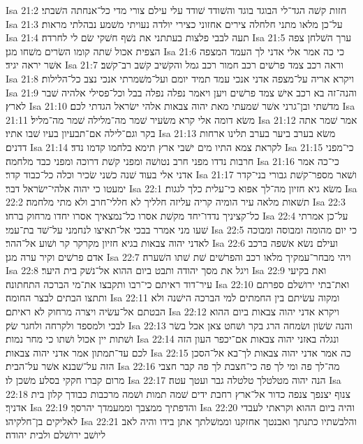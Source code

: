 Isa 21:2  חזות קשׁה הגד־לי הבוגד בוגד והשׁודד שׁודד עלי עילם צורי מדי כל־אנחתה השׁבתי׃
Isa 21:3  על־כן מלאו מתני חלחלה צירים אחזוני כצירי יולדה נעויתי משׁמע נבהלתי מראות׃
Isa 21:4  תעה לבבי פלצות בעתתני את נשׁף חשׁקי שׂם לי לחרדה׃
Isa 21:5  ערך השׁלחן צפה הצפית אכול שׁתה קומו השׂרים משׁחו מגן׃
Isa 21:6  כי כה אמר אלי אדני לך העמד המצפה אשׁר יראה יגיד׃
Isa 21:7  וראה רכב צמד פרשׁים רכב חמור רכב גמל והקשׁיב קשׁב רב־קשׁב׃
Isa 21:8  ויקרא אריה על־מצפה אדני אנכי עמד תמיד יומם ועל־משׁמרתי אנכי נצב כל־הלילות׃
Isa 21:9  והנה־זה בא רכב אישׁ צמד פרשׁים ויען ויאמר נפלה נפלה בבל וכל־פסילי אלהיה שׁבר לארץ׃
Isa 21:10  מדשׁתי ובן־גרני אשׁר שׁמעתי מאת יהוה צבאות אלהי ישׂראל הגדתי לכם׃
Isa 21:11  משׂא דומה אלי קרא משׂעיר שׁמר מה־מלילה שׁמר מה־מליל׃
Isa 21:12  אמר שׁמר אתה בקר וגם־לילה אם־תבעיון בעיו שׁבו אתיו׃
Isa 21:13  משׂא בערב ביער בערב תלינו ארחות דדנים׃
Isa 21:14  לקראת צמא התיו מים ישׁבי ארץ תימא בלחמו קדמו נדד׃
Isa 21:15  כי־מפני חרבות נדדו מפני חרב נטושׁה ומפני קשׁת דרוכה ומפני כבד מלחמה׃
Isa 21:16  כי־כה אמר אדני אלי בעוד שׁנה כשׁני שׂכיר וכלה כל־כבוד קדר׃
Isa 21:17  ושׁאר מספר־קשׁת גבורי בני־קדר ימעטו כי יהוה אלהי־ישׂראל דבר׃
Isa 22:1  משׂא גיא חזיון מה־לך אפוא כי־עלית כלך לגגות׃
Isa 22:2  תשׁאות מלאה עיר הומיה קריה עליזה חלליך לא חללי־חרב ולא מתי מלחמה׃
Isa 22:3  כל־קציניך נדדו־יחד מקשׁת אסרו כל־נמצאיך אסרו יחדו מרחוק ברחו׃
Isa 22:4  על־כן אמרתי שׁעו מני אמרר בבכי אל־תאיצו לנחמני על־שׁד בת־עמי׃
Isa 22:5  כי יום מהומה ומבוסה ומבוכה לאדני יהוה צבאות בגיא חזיון מקרקר קר ושׁוע אל־ההר׃
Isa 22:6  ועילם נשׂא אשׁפה ברכב אדם פרשׁים וקיר ערה מגן׃
Isa 22:7  ויהי מבחר־עמקיך מלאו רכב והפרשׁים שׁת שׁתו השׁערה׃
Isa 22:8  ויגל את מסך יהודה ותבט ביום ההוא אל־נשׁק בית היער׃
Isa 22:9  ואת בקיעי עיר־דוד ראיתם כי־רבו ותקבצו את־מי הברכה התחתונה׃
Isa 22:10  ואת־בתי ירושׁלם ספרתם ותתצו הבתים לבצר החומה׃
Isa 22:11  ומקוה עשׂיתם בין החמתים למי הברכה הישׁנה ולא הבטתם אל־עשׂיה ויצרה מרחוק לא ראיתם׃
Isa 22:12  ויקרא אדני יהוה צבאות ביום ההוא לבכי ולמספד ולקרחה ולחגר שׂק׃
Isa 22:13  והנה שׂשׂון ושׂמחה הרג בקר ושׁחט צאן אכל בשׂר ושׁתות יין אכול ושׁתו כי מחר נמות׃
Isa 22:14  ונגלה באזני יהוה צבאות אם־יכפר העון הזה לכם עד־תמתון אמר אדני יהוה צבאות׃
Isa 22:15  כה אמר אדני יהוה צבאות לך־בא אל־הסכן הזה על־שׁבנא אשׁר על־הבית׃
Isa 22:16  מה־לך פה ומי לך פה כי־חצבת לך פה קבר חצבי מרום קברו חקקי בסלע משׁכן לו׃
Isa 22:17  הנה יהוה מטלטלך טלטלה גבר ועטך עטה׃
Isa 22:18  צנוף יצנפך צנפה כדור אל־ארץ רחבת ידים שׁמה תמות ושׁמה מרכבות כבודך קלון בית אדניך׃
Isa 22:19  והדפתיך ממצבך וממעמדך יהרסך׃
Isa 22:20  והיה ביום ההוא וקראתי לעבדי לאליקים בן־חלקיהו׃
Isa 22:21  והלבשׁתיו כתנתך ואבנטך אחזקנו וממשׁלתך אתן בידו והיה לאב ליושׁב ירושׁלם ולבית יהודה׃
